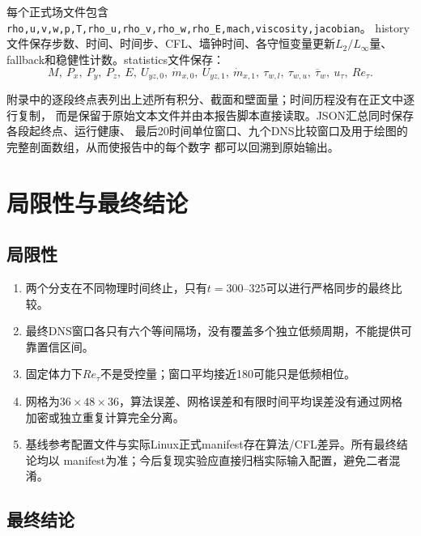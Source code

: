 \documentclass[UTF8,12pt,a4paper,fontset=fandol]{ctexart}
\newcommand{\Retau}{Re_{\tau}}
\newcommand{\utau}{u_{\tau}}
\newcommand{\code}[1]{\texttt{#1}}
\begin{document}
每个正式场文件包含
\code{rho,u,v,w,p,T,rho\_u,rho\_v,rho\_w,rho\_E,mach,viscosity,jacobian}。
history文件保存步数、时间、时间步、CFL、墙钟时间、各守恒变量更新$L_2/L_\infty$量、
fallback和稳健性计数。statistics文件保存：
\begin{equation*}
  M,\ P_x,\ P_y,\ P_z,\ E,\ U_{yz,0},\ \dot m_{x,0},\
  U_{yz,1},\ \dot m_{x,1},\ \tau_{w,l},\ \tau_{w,u},\
  \overline\tau_w,\ \utau,\ \Retau .
\end{equation*}

附录中的逐段终点表列出上述所有积分、截面和壁面量；时间历程没有在正文中逐行复制，
而是保留于原始文本文件并由本报告脚本直接读取。JSON汇总同时保存各段起终点、运行健康、
最后20时间单位窗口、九个DNS比较窗口及用于绘图的完整剖面数组，从而使报告中的每个数字
都可以回溯到原始输出。

\section{局限性与最终结论}

\subsection{局限性}

\begin{enumerate}
  \item 两个分支在不同物理时间终止，只有$t=300$--325可以进行严格同步的最终比较。
  \item 最终DNS窗口各只有六个等间隔场，没有覆盖多个独立低频周期，不能提供可靠置信区间。
  \item 固定体力下$\Retau$不是受控量；窗口平均接近180可能只是低频相位。
  \item 网格为$36\times48\times36$，算法误差、网格误差和有限时间平均误差没有通过网格
        加密或独立重复计算完全分离。
  \item 基线参考配置文件与实际Linux正式manifest存在算法/CFL差异。所有最终结论均以
        manifest为准；今后复现实验应直接归档实际输入配置，避免二者混淆。
\end{enumerate}

\subsection{最终结论}
\end{document}
